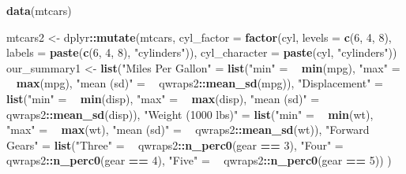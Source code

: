\documentclass[]{article}
\newenvironment{Shaded}{\begin{snugshade}}{\end{snugshade}}
\newcommand{\KeywordTok}[1]{\textcolor[rgb]{0.13,0.29,0.53}{\textbf{#1}}}
\newcommand{\DataTypeTok}[1]{\textcolor[rgb]{0.13,0.29,0.53}{#1}}
\newcommand{\DecValTok}[1]{\textcolor[rgb]{0.00,0.00,0.81}{#1}}
\newcommand{\StringTok}[1]{\textcolor[rgb]{0.31,0.60,0.02}{#1}}
\newcommand{\OperatorTok}[1]{\textcolor[rgb]{0.81,0.36,0.00}{\textbf{#1}}}
\newcommand{\ErrorTok}[1]{\textcolor[rgb]{0.64,0.00,0.00}{\textbf{#1}}}
\newcommand{\NormalTok}[1]{#1}
\begin{document}
\begin{Shaded}
\begin{Highlighting}[]
\KeywordTok{data}\NormalTok{(mtcars)}

\NormalTok{mtcars2 <-}
\StringTok{  }\NormalTok{dplyr}\OperatorTok{::}\KeywordTok{mutate}\NormalTok{(mtcars,}
                \DataTypeTok{cyl_factor =} \KeywordTok{factor}\NormalTok{(cyl,}
                                    \DataTypeTok{levels =} \KeywordTok{c}\NormalTok{(}\DecValTok{6}\NormalTok{, }\DecValTok{4}\NormalTok{, }\DecValTok{8}\NormalTok{),}
                                    \DataTypeTok{labels =} \KeywordTok{paste}\NormalTok{(}\KeywordTok{c}\NormalTok{(}\DecValTok{6}\NormalTok{, }\DecValTok{4}\NormalTok{, }\DecValTok{8}\NormalTok{), }\StringTok{"cylinders"}\NormalTok{)),}
                \DataTypeTok{cyl_character =} \KeywordTok{paste}\NormalTok{(cyl, }\StringTok{"cylinders"}\NormalTok{))}
\NormalTok{our_summary1 <-}
\StringTok{  }\KeywordTok{list}\NormalTok{(}\StringTok{"Miles Per Gallon"}\NormalTok{ =}
\StringTok{       }\KeywordTok{list}\NormalTok{(}\StringTok{"min"}\NormalTok{ =}\StringTok{ }\ErrorTok{~}\StringTok{ }\KeywordTok{min}\NormalTok{(mpg),}
            \StringTok{"max"}\NormalTok{ =}\StringTok{ }\ErrorTok{~}\StringTok{ }\KeywordTok{max}\NormalTok{(mpg),}
            \StringTok{"mean (sd)"}\NormalTok{ =}\StringTok{ }\ErrorTok{~}\StringTok{ }\NormalTok{qwraps2}\OperatorTok{::}\KeywordTok{mean_sd}\NormalTok{(mpg)),}
       \StringTok{"Displacement"}\NormalTok{ =}
\StringTok{       }\KeywordTok{list}\NormalTok{(}\StringTok{"min"}\NormalTok{ =}\StringTok{ }\ErrorTok{~}\StringTok{ }\KeywordTok{min}\NormalTok{(disp),}
            \StringTok{"max"}\NormalTok{ =}\StringTok{ }\ErrorTok{~}\StringTok{ }\KeywordTok{max}\NormalTok{(disp),}
            \StringTok{"mean (sd)"}\NormalTok{ =}\StringTok{ }\ErrorTok{~}\StringTok{ }\NormalTok{qwraps2}\OperatorTok{::}\KeywordTok{mean_sd}\NormalTok{(disp)),}
       \StringTok{"Weight (1000 lbs)"}\NormalTok{ =}
\StringTok{       }\KeywordTok{list}\NormalTok{(}\StringTok{"min"}\NormalTok{ =}\StringTok{ }\ErrorTok{~}\StringTok{ }\KeywordTok{min}\NormalTok{(wt),}
            \StringTok{"max"}\NormalTok{ =}\StringTok{ }\ErrorTok{~}\StringTok{ }\KeywordTok{max}\NormalTok{(wt),}
            \StringTok{"mean (sd)"}\NormalTok{ =}\StringTok{ }\ErrorTok{~}\StringTok{ }\NormalTok{qwraps2}\OperatorTok{::}\KeywordTok{mean_sd}\NormalTok{(wt)),}
       \StringTok{"Forward Gears"}\NormalTok{ =}
\StringTok{       }\KeywordTok{list}\NormalTok{(}\StringTok{"Three"}\NormalTok{ =}\StringTok{ }\ErrorTok{~}\StringTok{ }\NormalTok{qwraps2}\OperatorTok{::}\KeywordTok{n_perc0}\NormalTok{(gear }\OperatorTok{==}\StringTok{ }\DecValTok{3}\NormalTok{),}
            \StringTok{"Four"}\NormalTok{  =}\StringTok{ }\ErrorTok{~}\StringTok{ }\NormalTok{qwraps2}\OperatorTok{::}\KeywordTok{n_perc0}\NormalTok{(gear }\OperatorTok{==}\StringTok{ }\DecValTok{4}\NormalTok{),}
            \StringTok{"Five"}\NormalTok{  =}\StringTok{ }\ErrorTok{~}\StringTok{ }\NormalTok{qwraps2}\OperatorTok{::}\KeywordTok{n_perc0}\NormalTok{(gear }\OperatorTok{==}\StringTok{ }\DecValTok{5}\NormalTok{))}
\NormalTok{       )}


\end{Highlighting}
\end{Shaded}
\end{document}
